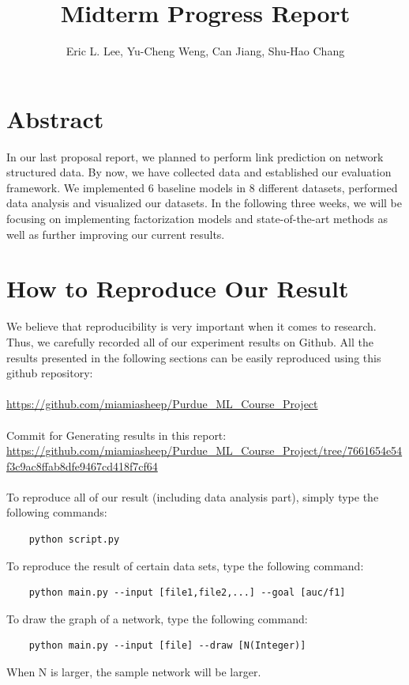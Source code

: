 \documentclass[12pt]{article}
\begin{document}
 
	\title{Midterm Progress Report}
	\author{Eric L. Lee, Yu-Cheng Weng, Can Jiang, Shu-Hao Chang} 
	\maketitle
	
	\section{Abstract}
	
	In our last proposal report, we planned to perform link prediction on network structured data.
	By now, we have collected data and established our evaluation framework. We implemented 6 baseline models in 8 different datasets, performed data analysis and visualized our datasets. In the following three weeks, we will be focusing on implementing factorization models and state-of-the-art methods as well as further improving our current results. 
	
	\section{How to Reproduce Our Result}
	We believe that reproducibility is very important when it comes to research. Thus, we carefully recorded all of our experiment results on Github. All the results presented in the following sections can be easily reproduced using this github repository: 
	\\
	\\
	\url{https://github.com/miamiasheep/Purdue\_ML\_Course\_Project}
	\\
	\\
	Commit for Generating results in this report: \\
	\url{https://github.com/miamiasheep/Purdue_ML_Course_Project/tree/7661654e54f3c9ac8ffab8dfe9467cd418f7cf64}
	\\
	\\
	To reproduce all of our result (including data analysis part), simply type the following commands: 
	\begin{lstlisting}
	python script.py
	\end{lstlisting}
	To reproduce the result of certain data sets, type the following command:
	\begin{lstlisting}
	python main.py --input [file1,file2,...] --goal [auc/f1]
	\end{lstlisting}
	To draw the graph of a network, type the following command:
	\begin{lstlisting}
	python main.py --input [file] --draw [N(Integer)]
	\end{lstlisting}
	When N is larger, the sample network will be larger.
	
\end{document}
